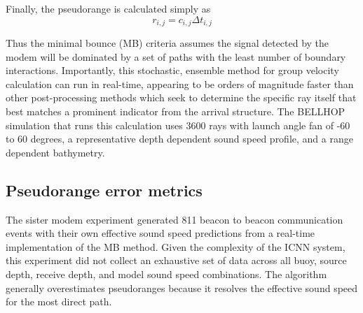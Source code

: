 Finally, the pseudorange is calculated simply as
\begin{equation}
r_{i,j} = c_{i,j} \Delta t_{i,j} 
\end{equation}

Thus the minimal bounce (MB) criteria assumes the signal detected by the modem will be dominated by a set of paths with the least number of boundary interactions.
Importantly, this stochastic, ensemble method for group velocity calculation can run in real-time, appearing to be orders of magnitude faster than other post-processing methods which seek to determine the specific ray itself that best matches a prominent indicator from the arrival structure.
The BELLHOP simulation that runs this calculation uses 3600 rays with launch angle fan of -60 to 60 degrees, a representative depth dependent sound speed profile, and a range dependent bathymetry. 

\subsection{Pseudorange error metrics}

The sister modem experiment generated 811 beacon to beacon communication events with their own effective sound speed predictions from a real-time implementation of the MB method.
Given the complexity of the ICNN system, this experiment did not collect an exhaustive set of data across all buoy, source depth, receive depth, and model sound speed combinations.
 The algorithm generally overestimates pseudoranges because it resolves the effective sound speed for the most direct path.

